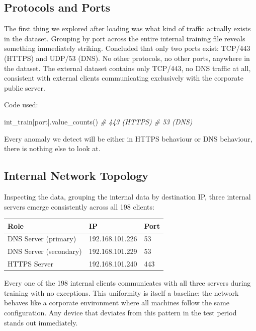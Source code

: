 \documentclass[
  11pt,
]{article}
\newenvironment{Shaded}{\vspace{4pt}}{\vspace{4pt}}
\newcommand{\CommentTok}[1]{\textcolor[rgb]{0.38,0.63,0.69}{\textit{#1}}}
\newcommand{\NormalTok}[1]{#1}
\newcommand{\StringTok}[1]{\textcolor[rgb]{0.25,0.44,0.63}{#1}}
\begin{document}
\hypertarget{protocols-and-ports}{%
\subsection{Protocols and Ports}\label{protocols-and-ports}}

The first thing we explored after loading was what kind of traffic
actually exists in the dataset. Grouping by port across the entire
internal training file reveals something immediately striking. Concluded
that only two ports exist: TCP/443 (HTTPS) and UDP/53 (DNS). No other
protocols, no other ports, anywhere in the dataset. The external dataset
contains only TCP/443, no DNS traffic at all, consistent with external
clients communicating exclusively with the corporate public server.

Code used:

\begin{Shaded}
\begin{Highlighting}[]
\NormalTok{int\_train[}\StringTok{\textquotesingle{}port\textquotesingle{}}\NormalTok{].value\_counts()}
\CommentTok{\# 443 (HTTPS)}
\CommentTok{\# 53 (DNS)}
\end{Highlighting}
\end{Shaded}

Every anomaly we detect will be either in HTTPS behaviour or DNS
behaviour, there is nothing else to look at.

\hypertarget{internal-network-topology}{%
\subsection{Internal Network Topology}\label{internal-network-topology}}

Inspecting the data, grouping the internal data by destination IP, three
internal servers emerge consistently across all 198 clients:

\begin{longtable}[]{@{}lll@{}}
\toprule\noalign{}
Role & IP & Port \\
\midrule\noalign{}
\endhead
\bottomrule\noalign{}
\endlastfoot
DNS Server (primary) & 192.168.101.226 & 53 \\
DNS Server (secondary) & 192.168.101.229 & 53 \\
HTTPS Server & 192.168.101.240 & 443 \\
\end{longtable}

Every one of the 198 internal clients communicates with all three
servers during training with no exceptions. This uniformity is itself a
baseline: the network behaves like a corporate environment where all
machines follow the same configuration. Any device that deviates from
this pattern in the test period stands out immediately.
\end{document}
